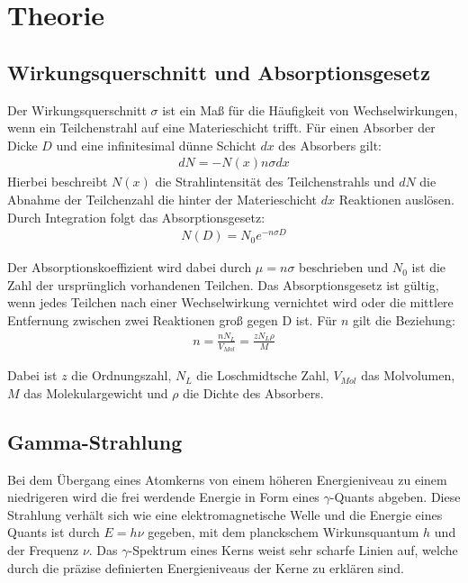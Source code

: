 \section{Theorie}
\label{sec:Theorie}

\cite{sample}
\subsection{Wirkungsquerschnitt und Absorptionsgesetz}
Der Wirkungsquerschnitt $\sigma$ ist ein Maß für die Häufigkeit von Wechselwirkungen, wenn ein Teilchenstrahl
auf eine Materieschicht trifft. Für einen Absorber der Dicke $D$ und eine infinitesimal dünne Schicht $dx$ des
Absorbers gilt:
\begin{align}
  dN = -N(x)n \sigma dx
\end{align}
Hierbei beschreibt $N(x)$ die Strahlintensität des Teilchenstrahls und $dN$ die Abnahme der Teilchenzahl
die hinter der Materieschicht $dx$ Reaktionen auslösen. Durch Integration folgt das Absorptionsgesetz:
\begin{align}
  N(D) = N_0 e^{-n  \sigma D}
\end{align}

Der Absorptionskoeffizient wird dabei durch $\mu = n \sigma$ beschrieben und $N_0$ ist die Zahl der ursprünglich
vorhandenen Teilchen. Das Absorptionsgesetz ist gültig, wenn jedes Teilchen nach einer Wechselwirkung vernichtet wird oder
die mittlere Entfernung zwischen zwei Reaktionen groß gegen D ist. Für $n$ gilt die Beziehung:
\begin{align}
  n = \frac{n N_L}{V_{Mol}} = \frac{z N_L \rho}{M}
\end{align}

Dabei ist $z$ die Ordnungszahl, $N_L$ die Loschmidtsche Zahl, $V_{Mol}$ das Molvolumen, $M$ das Molekulargewicht
und $\rho$ die Dichte des Absorbers.


\subsection{Gamma-Strahlung}

Bei dem Übergang eines Atomkerns von einem höheren Energieniveau zu einem niedrigeren wird die
frei werdende Energie in Form eines $\gamma$-Quants abgeben. Diese Strahlung verhält sich wie eine elektromagnetische Welle und
die Energie eines Quants ist durch $E = h \nu$ gegeben, mit dem planckschem Wirkunsquantum $h$ und der Frequenz $\nu$.
Das $\gamma$-Spektrum  eines Kerns weist sehr scharfe Linien auf, welche durch die präzise definierten Energieniveaus der Kerne
zu erklären sind.


